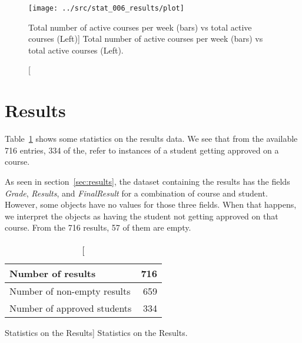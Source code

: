 \begin{figure}[h!]
    \centering

    \texttt{[image: ../src/stat\_006\_results/plot]}

    \caption
        [Total number of active courses per week (bars) vs total active courses (Left)]
        {Total number of active courses per week (bars) vs total active courses (Left).}

    \label{fig:stat_006}
\end{figure}

\section{Results}

Table~\ref{tab:results_stats} shows some statistics on the results data. We see
that from the available 716 entries, 334 of the, refer to instances of a
student getting approved on a course.

As seen in section~\ref{sec:results}, the dataset containing the results has
the fields \textit{Grade}, \textit{Results}, and \textit{FinalResult} for a
combination of course and student. However, some objects have no values for
those three fields. When that happens, we interpret the objects as having the
student not getting approved on that course. From the 716 results, 57 of them
are empty.

\begin{table}[h!]
    \centering

    \begin{tabular}{| l | r |}
        \hline
        Number of results           & 716 \\ \hline
        Number of non-empty results & 659  \\ \hline
        Number of approved students & 334 \\ \hline
    \end{tabular}

    \caption
        [Statistics on the Results]
        {Statistics on the Results.}

    \label{tab:results_stats}
\end{table}
